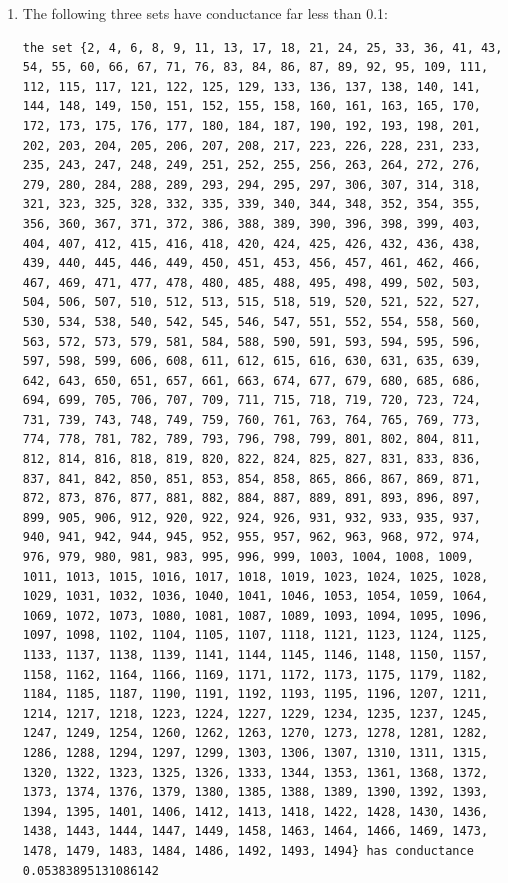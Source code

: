\documentclass[12pt]{article}
\begin{document}
\begin{enumerate}[leftmargin=\labelsep, label=(\alph*)]
        \item The following three sets have conductance far less than 0.1:
        \begin{lstlisting}
the set {2, 4, 6, 8, 9, 11, 13, 17, 18, 21, 24, 25, 33, 36, 41, 43, 54, 55, 60, 66, 67, 71, 76, 83, 84, 86, 87, 89, 92, 95, 109, 111, 112, 115, 117, 121, 122, 125, 129, 133, 136, 137, 138, 140, 141, 144, 148, 149, 150, 151, 152, 155, 158, 160, 161, 163, 165, 170, 172, 173, 175, 176, 177, 180, 184, 187, 190, 192, 193, 198, 201, 202, 203, 204, 205, 206, 207, 208, 217, 223, 226, 228, 231, 233, 235, 243, 247, 248, 249, 251, 252, 255, 256, 263, 264, 272, 276, 279, 280, 284, 288, 289, 293, 294, 295, 297, 306, 307, 314, 318, 321, 323, 325, 328, 332, 335, 339, 340, 344, 348, 352, 354, 355, 356, 360, 367, 371, 372, 386, 388, 389, 390, 396, 398, 399, 403, 404, 407, 412, 415, 416, 418, 420, 424, 425, 426, 432, 436, 438, 439, 440, 445, 446, 449, 450, 451, 453, 456, 457, 461, 462, 466, 467, 469, 471, 477, 478, 480, 485, 488, 495, 498, 499, 502, 503, 504, 506, 507, 510, 512, 513, 515, 518, 519, 520, 521, 522, 527, 530, 534, 538, 540, 542, 545, 546, 547, 551, 552, 554, 558, 560, 563, 572, 573, 579, 581, 584, 588, 590, 591, 593, 594, 595, 596, 597, 598, 599, 606, 608, 611, 612, 615, 616, 630, 631, 635, 639, 642, 643, 650, 651, 657, 661, 663, 674, 677, 679, 680, 685, 686, 694, 699, 705, 706, 707, 709, 711, 715, 718, 719, 720, 723, 724, 731, 739, 743, 748, 749, 759, 760, 761, 763, 764, 765, 769, 773, 774, 778, 781, 782, 789, 793, 796, 798, 799, 801, 802, 804, 811, 812, 814, 816, 818, 819, 820, 822, 824, 825, 827, 831, 833, 836, 837, 841, 842, 850, 851, 853, 854, 858, 865, 866, 867, 869, 871, 872, 873, 876, 877, 881, 882, 884, 887, 889, 891, 893, 896, 897, 899, 905, 906, 912, 920, 922, 924, 926, 931, 932, 933, 935, 937, 940, 941, 942, 944, 945, 952, 955, 957, 962, 963, 968, 972, 974, 976, 979, 980, 981, 983, 995, 996, 999, 1003, 1004, 1008, 1009, 1011, 1013, 1015, 1016, 1017, 1018, 1019, 1023, 1024, 1025, 1028, 1029, 1031, 1032, 1036, 1040, 1041, 1046, 1053, 1054, 1059, 1064, 1069, 1072, 1073, 1080, 1081, 1087, 1089, 1093, 1094, 1095, 1096, 1097, 1098, 1102, 1104, 1105, 1107, 1118, 1121, 1123, 1124, 1125, 1133, 1137, 1138, 1139, 1141, 1144, 1145, 1146, 1148, 1150, 1157, 1158, 1162, 1164, 1166, 1169, 1171, 1172, 1173, 1175, 1179, 1182, 1184, 1185, 1187, 1190, 1191, 1192, 1193, 1195, 1196, 1207, 1211, 1214, 1217, 1218, 1223, 1224, 1227, 1229, 1234, 1235, 1237, 1245, 1247, 1249, 1254, 1260, 1262, 1263, 1270, 1273, 1278, 1281, 1282, 1286, 1288, 1294, 1297, 1299, 1303, 1306, 1307, 1310, 1311, 1315, 1320, 1322, 1323, 1325, 1326, 1333, 1344, 1353, 1361, 1368, 1372, 1373, 1374, 1376, 1379, 1380, 1385, 1388, 1389, 1390, 1392, 1393, 1394, 1395, 1401, 1406, 1412, 1413, 1418, 1422, 1428, 1430, 1436, 1438, 1443, 1444, 1447, 1449, 1458, 1463, 1464, 1466, 1469, 1473, 1478, 1479, 1483, 1484, 1486, 1492, 1493, 1494} has conductance 0.05383895131086142


\end{lstlisting}
\end{enumerate}
\end{document}
